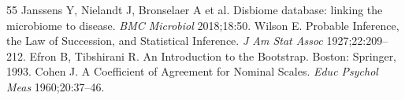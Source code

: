 \documentclass[11pt,a4paper]{article}
\begin{document}
\begin{thebibliography}{55}
Janssens Y, Nielandt J, Bronselaer A et al. Disbiome database: linking the microbiome to disease. \emph{BMC Microbiol} 2018;18:50.
Wilson E. Probable Inference, the Law of Succession, and Statistical Inference. \emph{J Am Stat Assoc} 1927;22:209–212.
Efron B, Tibshirani R. An Introduction to the Bootstrap. Boston: Springer, 1993.
Cohen J. A Coefficient of Agreement for Nominal Scales. \emph{Educ Psychol Meas} 1960;20:37–46.
\end{thebibliography}
\end{document}
